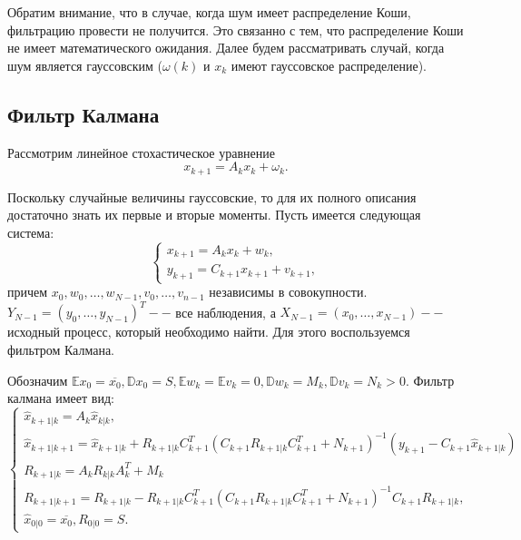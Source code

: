 \documentclass[11pt]{article}
\numberwithin{equation}{section}
\begin{document}
Обратим внимание, что в случае, когда шум имеет распределение Коши, фильтрацию провести не получится.
Это связанно с тем, что распределение Коши не имеет математического ожидания.
Далее будем рассматривать случай, когда шум является гауссовским ($\omega(k)$ и $x_k$ имеют гауссовское распределение).
\subsection{Фильтр Калмана}
Рассмотрим линейное стохастическое уравнение 
$$x_{k+1} = A_k x_k + \omega_k. $$

Поскольку случайные величины гауссовские, то для их полного описания достаточно знать их первые и вторые моменты.
Пусть имеется следующая система:
\begin{equation*}
  \begin{cases}
    x_{k+1} = A_kx_k + w_k, \\
    y_{k+1} = C_{k+1}x_{k+1} + v_{k+1},
  \end{cases}
\end{equation*}
причем $x_0, w_0, \dots, w_{N-1}, v_0, \dots, v_{n-1}$ независимы в совокупности.
$Y_{N-1} = (y_0, \dots, y_{N-1})^T -- $ все наблюдения, а $X_{N-1} = (x_0, \dots, x_{N-1}) --$
исходный процесс, который необходимо найти. Для этого воспользуемся фильтром Калмана.

Обозначим $\mathbb{E}x_0 = \overline{x_0}, \mathbb{D}x_0 =S, \mathbb{E}w_k = \mathbb{E}v_k = 0, \mathbb{D}w_k = M_k, \mathbb{D}v_k = N_k >0.$
Фильтр калмана имеет вид:
\begin{equation*}
  \begin{cases}
    \hat{x}_{k+1|k} = A_k \hat{x}_{k|k},\\
    \hat{x}_{k+1|k+1} = \hat{x}_{k+1|k}+R_{k+1|k}C_{k+1}^T(C_{k+1} R_{k+1|k}C_{k+1}^T +N_{k+1})^{-1} (y_{k+1}-C_{k+1} \hat{x}_{k+1|k})\\
    R_{k+1|k} = A_k R_{k|k} A_k^T + M_k\\
    R_{k+1|k+1} =  R_{k+1|k} -  R_{k+1|k}C_{k+1}^T(C_{k+1} R_{k+1|k}C_{k+1}^T +N_{k+1})^{-1}C_{k+1} R_{k+1|k},\\
    \hat{x}_{0|0} = \overline{x_0},
    R_{0|0} =S.
  \end{cases}
\end{equation*}
\end{document}
